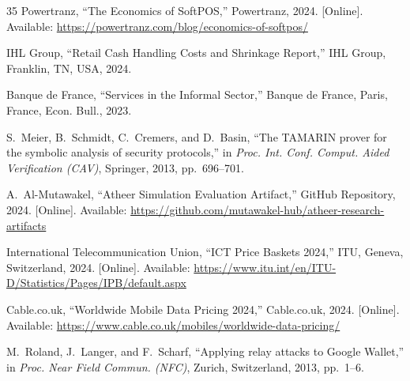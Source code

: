 \documentclass[conference,10pt]{IEEEtran}
\begin{document}
\begin{thebibliography}{35}
Powertranz, ``The Economics of SoftPOS,'' Powertranz, 2024. [Online]. Available: \url{https://powertranz.com/blog/economics-of-softpos/}

IHL Group, ``Retail Cash Handling Costs and Shrinkage Report,'' IHL Group, Franklin, TN, USA, 2024.

Banque de France, ``Services in the Informal Sector,'' Banque de France, Paris, France, Econ. Bull., 2023.

S.~Meier, B.~Schmidt, C.~Cremers, and D.~Basin, ``The TAMARIN prover for the symbolic analysis of security protocols,'' in \emph{Proc. Int. Conf. Comput. Aided Verification (CAV)}, Springer, 2013, pp.~696--701.

A.~Al-Mutawakel, ``Atheer Simulation Evaluation Artifact,'' GitHub Repository, 2024. [Online]. Available: \url{https://github.com/mutawakel-hub/atheer-research-artifacts}

International Telecommunication Union, ``ICT Price Baskets 2024,'' ITU, Geneva, Switzerland, 2024. [Online]. Available: \url{https://www.itu.int/en/ITU-D/Statistics/Pages/IPB/default.aspx}

Cable.co.uk, ``Worldwide Mobile Data Pricing 2024,'' Cable.co.uk, 2024. [Online]. Available: \url{https://www.cable.co.uk/mobiles/worldwide-data-pricing/}

M.~Roland, J.~Langer, and F.~Scharf, ``Applying relay attacks to Google Wallet,'' in \emph{Proc. Near Field Commun. (NFC)}, Zurich, Switzerland, 2013, pp.~1--6.

\end{thebibliography}
\end{document}
